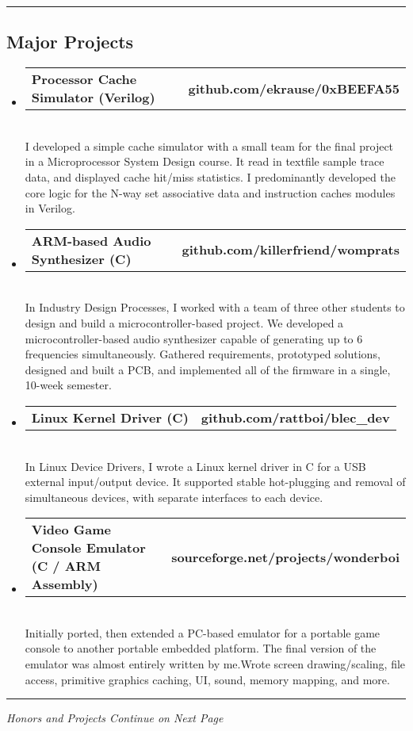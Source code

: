\documentclass[10pt,letterpaper]{article}
\makeatletter
\newcommand{\headerrow}[2]
{\begin{tabular*}{\linewidth}{l@{\extracolsep{\fill}}r}
	#1 &
	#2 \\
\end{tabular*}}
\makeatother
\begin{document}
\hrule
\vspace{-0.4em}
\subsection*{Major Projects}
\begin{itemize}
  \item 
  \headerrow 
  {\textbf{Processor Cache Simulator (Verilog)}}
  {\textbf{github.com/ekrause/0xBEEFA55}}
  \\
  I developed a simple cache simulator with a small team for the final project in a Microprocessor System Design course. It read in textfile sample trace data, and displayed cache hit/miss statistics. I predominantly developed the core logic for the N-way set associative data and instruction caches modules in Verilog.
  \item 
  \headerrow 
  {\textbf{ARM-based Audio Synthesizer (C)}}
  {\textbf{github.com/killerfriend/womprats}}
  \\
  In Industry Design Processes, I worked with a team of three other students to design and build a microcontroller-based project. We developed a microcontroller-based audio synthesizer capable of generating up to 6 frequencies simultaneously. Gathered requirements, prototyped solutions, designed and built a PCB, and implemented all of the firmware in a single, 10-week semester. 
  \item 
  \headerrow 
  {\textbf{Linux Kernel Driver (C)}}
  {\textbf{github.com/rattboi/blec\_dev}}
  \\
  In Linux Device Drivers, I wrote a Linux kernel driver in C for a USB external input/output device. It supported stable hot-plugging and removal of simultaneous devices, with separate interfaces to each device.
  \item 
  \headerrow 
  {\textbf{Video Game Console Emulator (C / ARM Assembly)}}
  {\textbf{sourceforge.net/projects/wonderboi}}
  \\
  Initially ported, then extended a PC-based emulator for a portable game console to another portable embedded platform. The final version of the emulator was almost entirely written by me.Wrote screen drawing/scaling, file access, primitive graphics caching, UI, sound, memory mapping, and more.
\end{itemize}

\hrule
\begin{center}
{\emph{Honors and Projects Continue on Next Page}}

\end{center}
\end{document}
